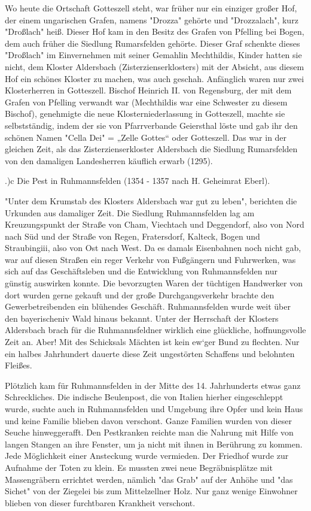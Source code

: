 Wo heute die Ortschaft Gotteszell steht, war früher nur ein einziger großer Hof,
der einem ungarischen Grafen, namens "Drozza" gehörte und "Drozzalach", kurz
"Droßlach" heiß. Dieser Hof kam in den Besitz des Grafen von Pfelling bei Bogen,
dem auch früher die Siedlung Rumarsfelden gehörte. Dieser Graf schenkte dieses
"Droßlach" im Einvernehmen mit seiner Gemahlin Mechthildis, Kinder hatten sie
nicht, dem Kloster Aldersbach (Zisterzienserklosters) mit der Absicht, aus
diesem Hof ein schönes Kloster zu machen, was auch geschah. Anfänglich waren nur
zwei Klosterherren in Gotteszell. Bischof Heinrich II. von Regensburg, der mit
dem Grafen von Pfelling verwandt war (Mechthildis war eine Schwester zu diesem
Bischof), genehmigte die neue Klosterniederlassung in Gotteszell, machte sie
selbstständig, indem der sie von Pfarrverbande Geiersthal löste und gab ihr den
schönen Namen "Cella Dei" = „Zelle Gottes“ oder Gotteszell. Das war in der
gleichen Zeit, als das Zisterzienserkloster Aldersbach die Siedlung Rumarsfelden
von den damaligen Landesherren käuflich erwarb (1295).

.)c Die Pest in Ruhmannsfelden (1354 - 1357 nach H. Geheimrat Eberl).

"Unter dem Krumstab des Klosters Aldersbach war gut zu leben", berichten die
Urkunden aus damaliger Zeit. Die Siedlung Ruhmannsfelden lag am Kreuzungspunkt
der Straße von Cham, Viechtach und Deggendorf, also von Nord nach Süd und der
Straße von Regen, Fratersdorf, Kalteck, Bogen und Straubingiii, also von Ost
nach West. Da es damals Eisenbahnen noch nicht gab, war auf diesen Straßen ein
reger Verkehr von Fußgängern und Fuhrwerken, was sich auf das Geschäftsleben und
die Entwicklung von Ruhmannsfelden nur günstig auswirken konnte. Die bevorzugten
Waren der tüchtigen Handwerker von dort wurden gerne gekauft und der große
Durchgangsverkehr brachte den Gewerbetreibenden ein blühendes Geschäft.
Ruhmannsfelden wurde weit über den bayerischeniv Wald hinaus bekannt. Unter der
Herrschaft der Klosters Aldersbach brach für die Ruhmannsfeldner wirklich eine
glückliche, hoffnungsvolle Zeit an. Aber! Mit des Schicksals Mächten ist kein
ew`ger Bund zu flechten. Nur ein halbes Jahrhundert dauerte diese Zeit
ungestörten Schaffens und belohnten Fleißes.

Plötzlich kam für Ruhmannsfelden in der Mitte des 14. Jahrhunderts etwas ganz
Schreckliches. Die indische Beulenpost, die von Italien hierher eingeschleppt
wurde, suchte auch in Ruhmannsfelden und Umgebung ihre Opfer und kein Haus und
keine Familie blieben davon verschont. Ganze Familien wurden von dieser Seuche
hinweggerafft. Den Pestkranken reichte man die Nahrung mit Hilfe von langen
Stangen an ihre Fenster, um ja nicht mit ihnen in Berührung zu kommen. Jede
Möglichkeit einer Ansteckung wurde vermieden. Der Friedhof wurde zur Aufnahme
der Toten zu klein. Es mussten zwei neue Begräbnisplätze mit Massengräbern
errichtet werden, nämlich "das Grab" auf der Anhöhe und "das Sichet" von der
Ziegelei bis zum Mittelzellner Holz. Nur ganz wenige Einwohner blieben von
dieser furchtbaren Krankheit verschont.

